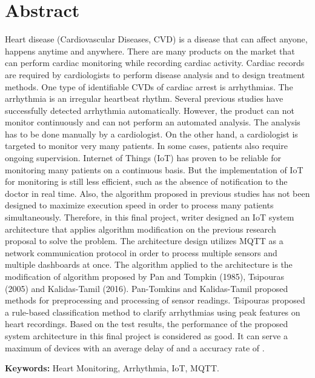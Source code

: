 \chapter*{Abstract}
Heart disease (Cardiovascular Diseases, CVD) is a disease that can affect anyone, happens anytime and anywhere. There are many products on the market that can perform cardiac monitoring while recording cardiac activity. Cardiac records are required by cardiologists to perform disease analysis and to design treatment methods. One type of identifiable CVDs of cardiac arrest is arrhythmias. The arrhythmia is an irregular heartbeat rhythm. Several previous studies have successfully detected arrhythmia automatically. 
However, the product can not monitor continuously and can not perform an automated analysis. The analysis has to be done manually by a cardiologist. On the other hand, a cardiologist is targeted to monitor very many patients. In some cases, patients also require ongoing supervision. Internet of Things (IoT) has proven to be reliable for monitoring many patients on a continuous basis. But the implementation of IoT for monitoring is still less efficient, such as the absence of notification to the doctor in real time. Also, the algorithm proposed in previous studies has not been designed to maximize execution speed in order to process many patients simultaneously. 
Therefore, in this final project, writer designed an IoT system architecture that applies algorithm modification on the previous research proposal to solve the problem. 
The architecture design utilizes MQTT as a network communication protocol in order to process multiple sensors and multiple dashboards at once. The algorithm applied to the architecture is the modification of algorithm proposed by Pan and Tompkin (1985), Tsipouras (2005) and Kalidas-Tamil (2016). Pan-Tomkins and Kalidas-Tamil proposed methods for preprocessing and processing of sensor readings. Tsipouras proposed a rule-based classification method to clarify arrhythmias using peak features on heart recordings. 
Based on the test results, the performance of the proposed system architecture in this final project is considered as good. It can serve a maximum of \sensor devices with an average delay of \delay and a accuracy rate of \accuracy.

\vspace{0.5 cm}
\begin{flushleft}
{\textbf{Keywords:} Heart Monitoring, Arrhythmia, IoT, MQTT.}
\end{flushleft}